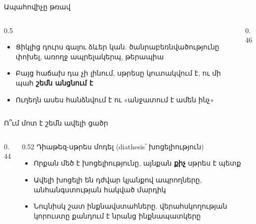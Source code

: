\begin{frame}{Ապահովիչը թռավ}
  \begin{columns}[c]
    \begin{column}{0.5\textwidth}
      \begin{itemize}
        \item Ցիկլից դուրս գալու ձևեր կան. ծանրաբեռնվածությունը փոխել, առողջ ապրելակերպ, թերապիա
        \item<2-> Բայց հաճախ դա չի լինում, սթրեսը կուտակվում է, ու մի պահ \textbf{շեմն անցնում է}
        \item<3-> Ուղեղն ասես հանձնվում է ու «անջատում է ամեն ինչ»
      \end{itemize}
    \end{column}
    \begin{column}{0.46\textwidth}
    \end{column}
  \end{columns}
\end{frame}

\begin{frame}{Ո՞ւմ մոտ է շեմն ավելի ցածր}
  \begin{columns}[c]
    \begin{column}{0.44\textwidth}
      \centering
      
    \end{column}
    \begin{column}{0.52\textwidth}
      {\blackfont\small Դիաթեզ-սթրես մոդել} {\small (diathesis՝ խոցելիություն)}\par\smallskip
      \begin{itemize}
        \item<2-> Որքան մեծ է խոցելիությունը, այնքան \textbf{քիչ} սթրես է պետք
        \item<3-> Ավելի խոցելի են դժվար կյանքով ապրողները, անհանգստության հակված մարդիկ
        \item<4-> Նույնիսկ շատ ինքնավստահները. վերահսկողության կորուստը քանդում է նրանց ինքնապատկերը
      \end{itemize}
    \end{column}
  \end{columns}
\end{frame}

